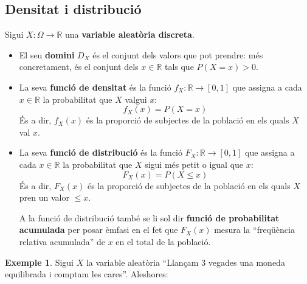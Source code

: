 \documentclass[
]{book}
\renewcommand{\leq}{\leqslant}
\theoremstyle{definition}
\theoremstyle{definition}
\newtheorem{example}{Exemple}[chapter]
\theoremstyle{definition}
\theoremstyle{remark}
\begin{document}
\hypertarget{densitat-i-distribuciuxf3}{%
\subsection{Densitat i distribució}\label{densitat-i-distribuciuxf3}}

Sigui \(X: \Omega\to \mathbb{R}\) una \textbf{variable aleatòria discreta}.

\begin{itemize}
\item
  El seu \textbf{domini} \(D_X\) és el conjunt dels valors que pot prendre: més concretament, és el conjunt dels \(x\in \mathbb{R}\) tals que \(P(X=x)>0\).
\item
  La seva \textbf{funció de densitat} és la funció \(f_X:\mathbb{R}\to [0,1]\) que assigna a cada \(x\in \mathbb{R}\) la probabilitat que \(X\) valgui \(x\):
  \[ 
  f_X(x)=P(X=x)
  \]
  És a dir, \(f_X(x)\) és la proporció de subjectes de la població en els quals \(X\) val \(x\).
\item
  La seva \textbf{funció de distribució} és la funció \(F_X:\mathbb{R}\to [0,1]\) que assigna a cada \(x\in \mathbb{R}\) la probabilitat que \(X\) sigui més petit o igual que \(x\):
  \[
  F_X(x)=P(X\leq x)
  \]
  És a dir, \(F_X(x)\) és la proporció de subjectes de la població en els quals \(X\) pren un valor \(\leq x\).

  A la funció de distribució també se li sol dir \textbf{funció de probabilitat acumulada} per posar èmfasi en el fet que \(F_X(x)\) mesura la ``freqüència relativa acumulada'' de \(x\) en el total de la població.
\end{itemize}

\begin{example}
\protect\hypertarget{exm:cars}{}{\label{exm:cars} }Sigui \(X\) la variable aleatòria ``Llançam 3 vegades una moneda equilibrada i comptam les cares''. Aleshores:
\end{example}
\end{document}
